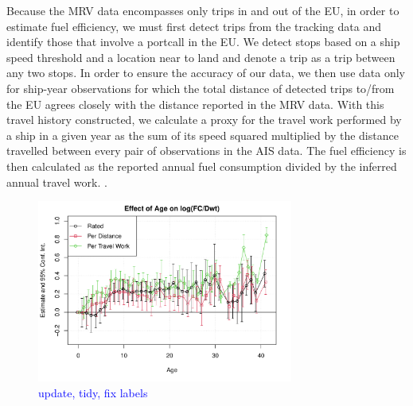 \documentclass[hidelinks, 12pt,letterpaper]{article}
\begin{document}
Because the MRV data encompasses only trips in and out of the EU, in order to estimate fuel efficiency, we must first detect trips from the tracking data and identify those that involve a portcall in the EU. We detect stops based on a ship speed threshold and a location near to land and denote a trip  as a trip between any two stops. In order to ensure the accuracy of our data, we then use data only for ship-year observations for which the total distance of detected trips to/from the EU agrees closely with the distance reported in the MRV data. With this travel history constructed, we calculate a proxy for the travel work performed by a ship in a given year as the sum of its speed squared multiplied by the distance travelled between every pair of observations in the AIS data. The fuel efficiency is then calculated as the reported annual fuel consumption divided by the inferred annual travel work.
.


\begin{figure}[h]
  \centering
  \includegraphics[width = 0.75\textwidth]{Efficiency_Regression_Size_Age_Coeffs_3.pdf}
  \caption{\textcolor{blue}{update, tidy, fix labels}}
  \label{fig:efficiency}
\end{figure}
\end{document}
